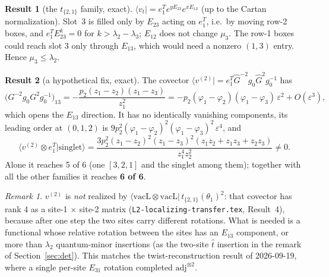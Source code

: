 \documentclass[11pt]{article}
\newcommand{\nb}[1]{\texttt{#1}}
\theoremstyle{definition}
\newtheorem{result}{Result}
\theoremstyle{remark}
\newtheorem*{remark}{Remark}
\begin{document}
\begin{result}[the $t_{\{2,1\}}$ family, exact]\label{res:whyB}
$\langle v_t|=e_1^Te^{yE_{23}}e^{xE_{12}}$ (up to the Cartan normalization). Slot~3 is filled only by $E_{23}$ acting on $e_1^T$, i.e.\ by moving row-2 boxes, and $e_1^TE_{23}^k=0$ for $k>\lambda_2-\lambda_3$; $E_{12}$ does not change $\mu_3$. The row-1 boxes could reach slot 3 only through $E_{13}$, which would need a nonzero $(1,3)$ entry. Hence $\mu_3\le\lambda_2$.
\end{result}

\begin{result}[a hypothetical fix, exact]\label{res:v2}
The covector $\langle v^{(2)}|=e_1^T\hat G^{-2}g_0\hat G^2g_0^{-1}$ has
\begin{equation}
\big(G^{-2}g_0G^2g_0^{-1}\big)_{13}=-\frac{p_2(z_1-z_2)(z_1-z_3)}{z_1^2}=-p_2(\varphi_1-\varphi_2)(\varphi_1-\varphi_3)\,\varepsilon^2+O(\varepsilon^3),
\end{equation}
which opens the $E_{13}$ direction. It has no identically vanishing components, its leading order at $(0,1,2)$ is $9p_2^2(\varphi_1-\varphi_2)^2(\varphi_1-\varphi_3)^2\,\varepsilon^4$, and
\begin{equation}
\langle v^{(2)}\otimes e_1^T|\text{singlet}\rangle=\frac{3p_2^2(z_1-z_2)^2(z_1-z_3)^2(z_1z_2+z_1z_3+z_2z_3)}{z_1^4z_2^2}\neq0 .
\end{equation}
Alone it reaches 5 of 6 (one $[3,2,1]$ and the singlet among them); together with all the other families it reaches \textbf{6 of 6}.
\end{result}

\begin{remark}
$v^{(2)}$ is \emph{not} realized by $\langle\mathrm{vacL}\otimes\mathrm{vacL}|\,t_{\{2,1\}}(\theta_1)^2$: that covector has rank 4 as a site-1 $\times$ site-2 matrix (\nb{L2-localizing-transfer.tex}, Result~4), because after one step the two sites carry different rotations. What is needed is a functional whose relative rotation between the sites has an $E_{13}$ component, or more than $\lambda_2$ quantum-minor insertions (as the two-site $\hat t$ insertion in the remark of Section~\ref{sec:det}). This matches the twist-reconstruction result of 2026-09-19, where a single per-site $E_{31}$ rotation completed $\mathrm{adj}^{\otimes2}$.
\end{remark}

\end{document}
